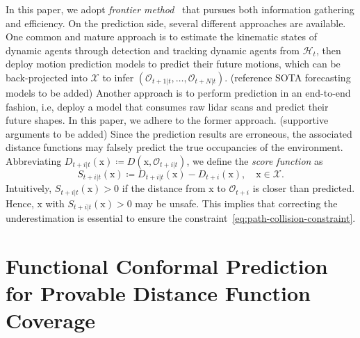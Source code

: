 \documentclass[lettersize,journal]{IEEEtran}
\begin{document}
In this paper, we adopt \emph{frontier method}~\cite{yamauchi1998frontier} that pursues both information gathering and efficiency.
On the prediction side, several different approaches are available. One common and mature approach is to estimate the kinematic states of dynamic agents through
detection and tracking dynamic agents from $\mathcal{H}_t$, then deploy motion prediction models to predict their future motions, which can be back-projected into $\mathcal{X}$ to infer $(\mathcal{O}_{t+1|t}, \ldots, \mathcal{O}_{t+N|t})$. {\color{teal}(reference SOTA forecasting models to be added)} Another approach is to perform prediction in an end-to-end fashion, i.e, deploy a model that consumes raw lidar scans and predict their future shapes. In this paper, we adhere to the former approach. {\color{teal}(supportive arguments to be added)}
Since the prediction results are erroneous, the associated distance functions may falsely predict the true occupancies of the environment. Abbreviating $D_{t+i|t}(\mathrm{x}) \coloneqq D(\mathrm{x}, \mathcal{O}_{t+i|t})$, we define the \emph{score function} as
\begin{equation}
S_{t+i|t} (\mathrm{x}) \coloneqq D_{t+i|t}(\mathrm{x}) - D_{t+i}(\mathrm{x}), \quad \mathrm{x}\in \mathcal{X}.
\end{equation}
Intuitively, $S_{t+i|t}(\mathrm{x}) > 0$ if the distance from $\mathrm{x}$ to $\mathcal{O}_{t+i}$ is closer than predicted. Hence, $\mathrm{x}$ with $S_{t+i|t}(\mathrm{x}) > 0$ may be unsafe.
This implies that correcting the underestimation is essential to ensure the constraint~\eqref{eq:path-collision-constraint}.

\section{Functional Conformal Prediction for Provable Distance Function Coverage}
\label{sec:functional_projection}
\end{document}
